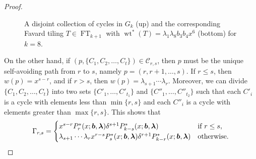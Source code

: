 \documentclass[oneside]{book}
\numberwithin{equation}{section}
\theoremstyle{definition}
\newcommand\FT{\operatorname{FT}}
\newcommand\wt{\operatorname{wt}}
\renewcommand\vec[1]{\bm{#1}}
\newcommand\vb{\vec{b}}
\newcommand\vla{\vec{\lambda}}
\def\BM#1{\draw [line width=2pt] (#1+0.9,0.9) rectangle +(-0.8,-0.8);}
\def\RM#1{\draw [line width=2pt,red] (#1+0.9,0.9) rectangle +(-0.8,-0.8);}
\def\BD#1{\draw [line width=2pt] (#1+0.9,0.9) rectangle +(-1.8,-0.8);}
\begin{document}
\begin{proof}
\begin{figure}
  \centering
{}
\caption{A disjoint collection of cycles in \( G_k \) (up) and the
  corresponding Favard tiling \(T\in\FT_{k+1}\) with
  \(\wt^*(T)=\lambda_1\lambda_8 b_3b_4 x^6 \) (bottom) for \( k=8 \).}
\label{fig:22}
\end{figure}



On the other hand, if
\( (p,\{C_1, C_2,\dots,C_t\})\in \mathcal{C}_{r,s} \), then \( p \)
must be the unique self-avoiding path from \( r \) to \( s \), namely
\( p=(r,r+1,\dots,s) \). If \( r\le s \), then \( w(p) = x^{s-r} \),
and if \( r> s \), then \( w(p) = \lambda_{s+1} \cdots \lambda_r \).
Moreover,  we can divide \( \{C_1, C_2,\dots,C_t\} \)
into two sets \( \{ C'_1,\dots,C'_{t_1}\} \)
and \( \{ C''_1,\dots,C''_{t_2}\} \)
such that each \( C'_i  \) is a cycle with elements less than \( \min\{r,s\} \)
and each \( C''_i  \) is a cycle with elements greater than \( \max\{r,s\} \).
This shows that
\begin{equation}\label{eq:63}
  \Gamma_{r,s} = 
  \begin{cases}
  x^{s-r} P^*_r(x;\vb,\vla) \delta^{s+1} P^*_{k-s}(x;\vb,\vla) & \mbox{if \( r\le s \)},\\
 \lambda_{s+1} \cdots \lambda_r x^{r-s}  P^*_s(x;\vb,\vla) \delta^{r+1} P^*_{k-r}(x;\vb,\vla) & \mbox{otherwise.}
  \end{cases}
\end{equation}


\end{proof}
\end{document}
